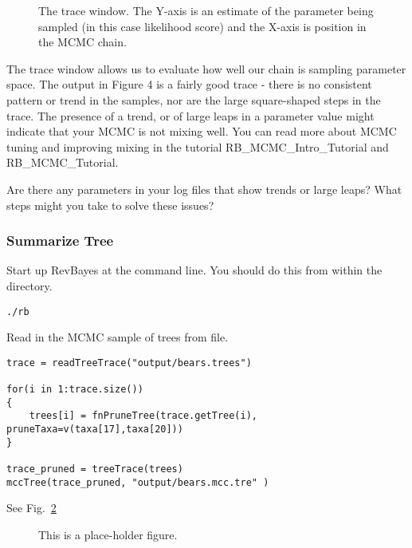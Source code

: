\begin{figure}[h!]
\centering
{}
\caption{\small The trace window. The Y-axis is an estimate of the parameter being sampled (in this case likelihood score) and the X-axis is position in the MCMC chain.}
\label{fig:tracer}
\end{figure}
The trace window allows us to evaluate how well our chain is sampling parameter space. The output in Figure 4 is a fairly good trace - there is no consistent pattern or trend in the samples, nor are the large square-shaped steps in the trace. The presence of a trend, or of large leaps in a parameter value might indicate that your MCMC is not mixing well. You can read more about MCMC tuning and improving mixing in the tutorial RB\_MCMC\_Intro\_Tutorial and RB\_MCMC\_Tutorial. \par

Are there any parameters in your log files that show trends or large leaps? What steps might you take to solve these issues? \par



\medskip
\subsubsection{Summarize Tree}\label{subsub:RB-SummarizeTree}


Start up RevBayes at the command line. You should do this from within the  directory.
{\tt \begin{snugshade*}
\begin{lstlisting}
./rb
\end{lstlisting}
\end{snugshade*}}

Read in the MCMC sample of trees from file.
{\tt \begin{snugshade*}
\begin{lstlisting}
trace = readTreeTrace("output/bears.trees")

for(i in 1:trace.size())
{
    trees[i] = fnPruneTree(trace.getTree(i), pruneTaxa=v(taxa[17],taxa[20]))
}

trace_pruned = treeTrace(trees)
mccTree(trace_pruned, "output/bears.mcc.tre" )
\end{lstlisting}
\end{snugshade*}}

See Fig.\ \ref{fig:IcyTreeSumm}

\begin{figure}[h!]
\centering
{}
\caption{\small This is a place-holder figure.}
\label{fig:IcyTreeSumm}
\end{figure}





